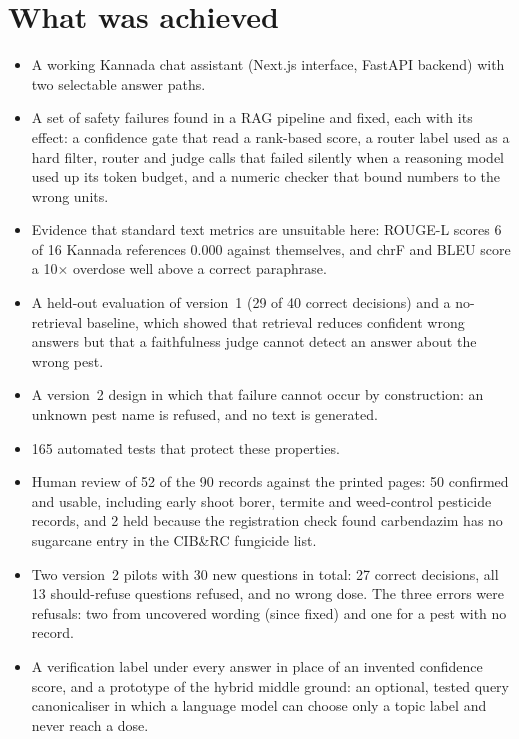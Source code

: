 \section{What was achieved}
\begin{itemize}
  \item A working Kannada chat assistant (Next.js interface, FastAPI backend) with two
    selectable answer paths.
  \item A set of safety failures found in a RAG pipeline and fixed, each with its effect:
    a confidence gate that read a rank-based score, a router label used as a hard filter,
    router and judge calls that failed silently when a reasoning model used up its token
    budget, and a numeric checker that bound numbers to the wrong units.
  \item Evidence that standard text metrics are unsuitable here: ROUGE-L scores 6 of 16
    Kannada references 0.000 against themselves, and chrF and BLEU score a 10$\times$
    overdose well above a correct paraphrase.
  \item A held-out evaluation of version~1 (29 of 40 correct decisions) and a no-retrieval
    baseline, which showed that retrieval reduces confident wrong answers but that a
    faithfulness judge cannot detect an answer about the wrong pest.
  \item A version~2 design in which that failure cannot occur by construction: an unknown
    pest name is refused, and no text is generated.
  \item 165 automated tests that protect these properties.
  \item Human review of 52 of the 90 records against the printed pages: 50 confirmed and
    usable, including early shoot borer, termite and weed-control pesticide records, and 2
    held because the registration check found carbendazim has no sugarcane entry in the
    CIB\&RC fungicide list.
  \item Two version~2 pilots with 30 new questions in total: 27 correct decisions, all 13
    should-refuse questions refused, and no wrong dose. The three errors were refusals: two
    from uncovered wording (since fixed) and one for a pest with no record.
  \item A verification label under every answer in place of an invented confidence score,
    and a prototype of the hybrid middle ground: an optional, tested query canonicaliser in
    which a language model can choose only a topic label and never reach a dose.
\end{itemize}

